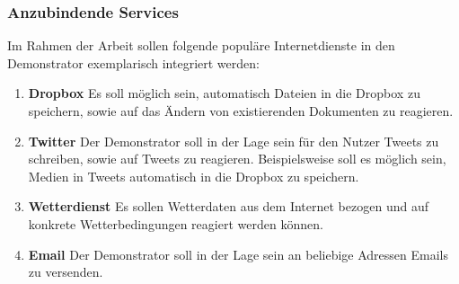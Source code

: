 \subsubsection{Anzubindende Services}
\label{subsec:anzubindende_services}
Im Rahmen der Arbeit sollen folgende populäre Internetdienste in den Demonstrator exemplarisch integriert werden:
\begin{enumerate}
\item \textbf{Dropbox}\cite{dropbox} Es soll möglich sein, automatisch Dateien in die Dropbox zu speichern, sowie auf das Ändern von existierenden Dokumenten zu reagieren.
\item \textbf{Twitter}\cite{twitter} Der Demonstrator soll in der Lage sein für den Nutzer Tweets zu schreiben, sowie auf Tweets zu reagieren. Beispielsweise soll es möglich sein, Medien in Tweets automatisch in die Dropbox zu speichern.
\item \textbf{Wetterdienst}\cite{wetterapi} Es sollen Wetterdaten aus dem Internet bezogen und auf konkrete Wetterbedingungen reagiert werden können.
\item \textbf{Email} Der Demonstrator soll in der Lage sein an beliebige Adressen Emails zu versenden.
\end{enumerate}



